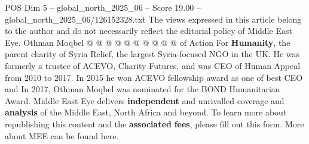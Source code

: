 \begin{textsample}{POS Dim 5 – global\_north\_2025\_06 – Score 19.00 – global\_north\_2025\_06/126152328.txt}
The views expressed in this article belong to the author and do not necessarily reflect the editorial policy of Middle East Eye.
Othman Moqbel @ @ @ @ @ @ @ @ @ @ of Action For \textbf{Humanity}, the parent charity of Syria Relief, the largest Syria-focused NGO in the UK.
He was formerly a trustee of ACEVO, Charity Futures. and was CEO of Human Appeal from 2010 to 2017.
In 2015 he won ACEVO fellowship award as one of best CEO and In 2017, Othman Moqbel was nominated for the BOND Humanitarian Award.
Middle East Eye delivers \textbf{independent} and unrivalled coverage and \textbf{analysis} of the Middle East, North Africa and beyond.
To learn more about republishing this content and the \textbf{associated} \textbf{fees}, please fill out this form.
More about MEE can be found here.

\end{textsample}
